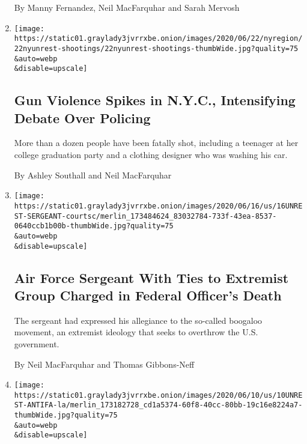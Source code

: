 \begin{enumerate}
  By Manny Fernandez, Neil MacFarquhar and Sarah Mervosh
\item
  \href{/2020/06/23/nyregion/nyc-shootings-surge.html}{}

  \texttt{[image: https://static01.graylady3jvrrxbe.onion/images/2020/06/22/nyregion/22nyunrest-shootings/22nyunrest-shootings-thumbWide.jpg?quality=75\\\&auto=webp\\\&disable=upscale]}

  \hypertarget{gun-violence-spikes-in-nyc-intensifying-debate-over-policing}{%
  \subsection{Gun Violence Spikes in N.Y.C., Intensifying Debate Over
  Policing}\label{gun-violence-spikes-in-nyc-intensifying-debate-over-policing}}

  More than a dozen people have been fatally shot, including a teenager
  at her college graduation party and a clothing designer who was
  washing his car.

  By Ashley Southall and Neil MacFarquhar
\item
  \href{/2020/06/16/us/steven-carrillo-air-force-boogaloo.html}{}

  \texttt{[image: https://static01.graylady3jvrrxbe.onion/images/2020/06/16/us/16UNREST-SERGEANT-courtsc/merlin\_173484624\_83032784-733f-43ea-8537-0640ccb1b00b-thumbWide.jpg?quality=75\\\&auto=webp\\\&disable=upscale]}

  \hypertarget{air-force-sergeant-with-ties-to-extremist-group-charged-in-federal-officers-death}{%
  \subsection{Air Force Sergeant With Ties to Extremist Group Charged in
  Federal Officer's
  Death}\label{air-force-sergeant-with-ties-to-extremist-group-charged-in-federal-officers-death}}

  The sergeant had expressed his allegiance to the so-called boogaloo
  movement, an extremist ideology that seeks to overthrow the U.S.
  government.

  By Neil MacFarquhar and Thomas Gibbons-Neff
\item
  \href{/2020/06/11/us/antifa-protests-george-floyd.html}{}

  \texttt{[image: https://static01.graylady3jvrrxbe.onion/images/2020/06/10/us/10UNREST-ANTIFA-la/merlin\_173182728\_cd1a5374-60f8-40cc-80bb-19c16e8224a7-thumbWide.jpg?quality=75\\\&auto=webp\\\&disable=upscale]}


\end{enumerate}
